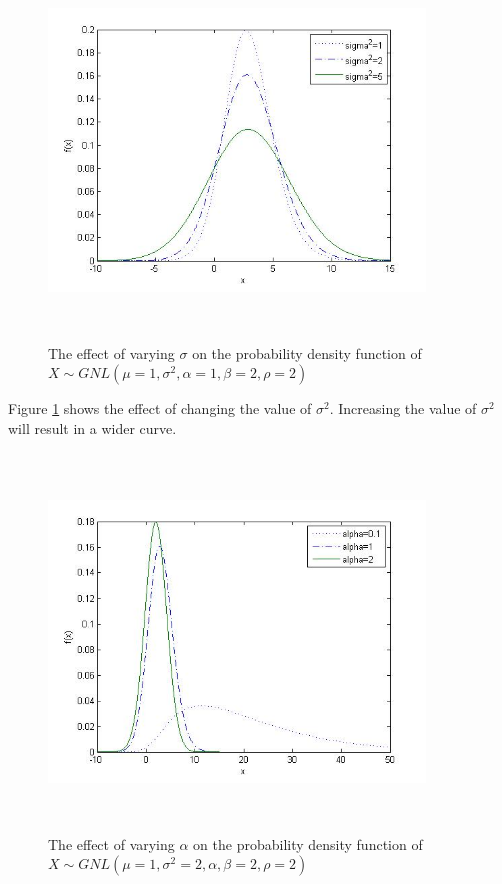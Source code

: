\documentclass[12pt,travaildirige,nobabel, twoside]{dms}
\numberwithin{equation}{section}
\numberwithin{table}{chapter}
\numberwithin{figure}{chapter}
\begin{document}
\begin{figure}[h!]
\caption{The effect of varying $\sigma$ on the probability density function of $X\sim GNL(\mu=1,\sigma^2,\alpha=1,\beta=2,\rho=2)$}\label{fig:sigma}
  \includegraphics[width=10cm,height=10cm,keepaspectratio]{sigma.jpg}
\end{figure}

Figure \ref{fig:sigma} shows the effect of changing the value of $\sigma^2$. Increasing the value of $\sigma^2$ will result in a wider curve.\\ 
\clearpage
\begin{figure}[h!]
\caption {The effect of varying $\alpha$ on the probability density function of $X\sim GNL(\mu=1,\sigma^2=2,\alpha,\beta=2,\rho=2)$}\label{fig:alpha}
  \includegraphics[width=10cm,height=10cm,keepaspectratio]{alpha.jpg}
\end{figure}
\end{document}
